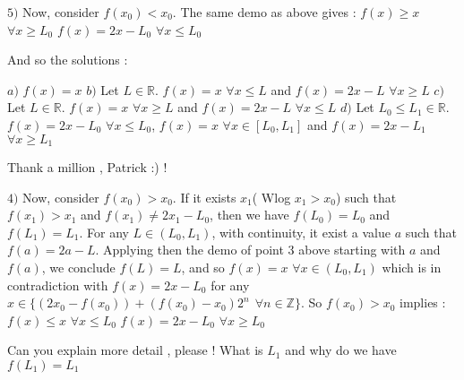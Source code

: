 \begin{mysolution}
$ 5)$ Now, consider $ f(x_0) < x_0$. The same demo as above gives :
$ f(x)\geq x$ $ \forall x\geq L_0$
$ f(x) = 2x - L_0$ $ \forall x\leq L_0$

And so the solutions :

$ a)$ $ f(x) = x$
$ b)$ Let $ L\in\mathbb{R}$. $ f(x) = x$ $ \forall x\leq L$ and $ f(x) = 2x - L$ $ \forall x\geq L$
$ c)$ Let $ L\in\mathbb{R}$. $ f(x) = x$ $ \forall x\geq L$ and $ f(x) = 2x - L$ $ \forall x\leq L$
$ d)$ Let $ L_0\leq L_1\in\mathbb{R}$. $ f(x) = 2x - L_0$ $ \forall x\leq L_0$, $ f(x) = x$ $ \forall x\in[L_0,L_1]$ and $ f(x) = 2x - L_1$ $ \forall x\geq L_1$
\end{mysolution}



\begin{mysolution}
	Thank a million , Patrick  :)  ! 
\begin{tcolorbox}
$ 4)$ Now, consider $ f(x_0) > x_0$. If it exists $ x_1$( Wlog $ x_1 > x_0$) such that $ f(x_1) > x_1$ and $ f(x_1)\neq 2x_1 - L_0$, then we have $ f(L_0) = L_0$ and $ f(L_1) = L_1$.
For any $ L\in(L_0,L_1)$, with continuity, it exist a value $ a$ such that $ f(a) = 2a - L$. Applying then the demo of point 3 above starting with $ a$ and $ f(a)$, we conclude $ f(L) = L$, and so $ f(x) = x$ $ \forall x\in(L_0,L_1)$ which is in contradiction with $ f(x) = 2x - L_0$ for any $ x\in\{(2x_0 - f(x_0)) + (f(x_0) - x_0)2^n\: \: \forall n\in\mathbb{Z}\}$.
So $ f(x_0) > x_0$  implies :
$ f(x)\leq x$ $ \forall x\leq L_0$
$ f(x) = 2x - L_0$ $ \forall x\geq L_0$
\end{tcolorbox}
Can you explain more detail , please ! What is $ L_1$ and why do we have $ f(L_1)=L_1$
\end{mysolution}



